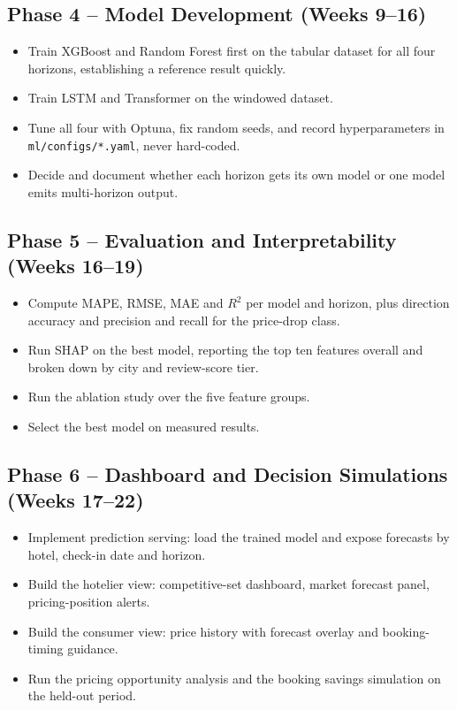\subsection{Phase 4 -- Model Development (Weeks 9--16)}

\begin{itemize}[leftmargin=*]
    \item Train XGBoost and Random Forest first on the tabular dataset for all four horizons, establishing a reference result quickly.
    \item Train LSTM and Transformer on the windowed dataset.
    \item Tune all four with Optuna, fix random seeds, and record hyperparameters in \texttt{ml/configs/*.yaml}, never hard-coded.
    \item Decide and document whether each horizon gets its own model or one model emits multi-horizon output.
\end{itemize}

\subsection{Phase 5 -- Evaluation and Interpretability (Weeks 16--19)}

\begin{itemize}[leftmargin=*]
    \item Compute MAPE, RMSE, MAE and $R^2$ per model and horizon, plus direction accuracy and precision and recall for the price-drop class.
    \item Run SHAP on the best model, reporting the top ten features overall and broken down by city and review-score tier.
    \item Run the ablation study over the five feature groups.
    \item Select the best model on measured results.
\end{itemize}

\subsection{Phase 6 -- Dashboard and Decision Simulations (Weeks 17--22)}

\begin{itemize}[leftmargin=*]
    \item Implement prediction serving: load the trained model and expose forecasts by hotel, check-in date and horizon.
    \item Build the hotelier view: competitive-set dashboard, market forecast panel, pricing-position alerts.
    \item Build the consumer view: price history with forecast overlay and booking-timing guidance.
    \item Run the pricing opportunity analysis and the booking savings simulation on the held-out period.
\end{itemize}

